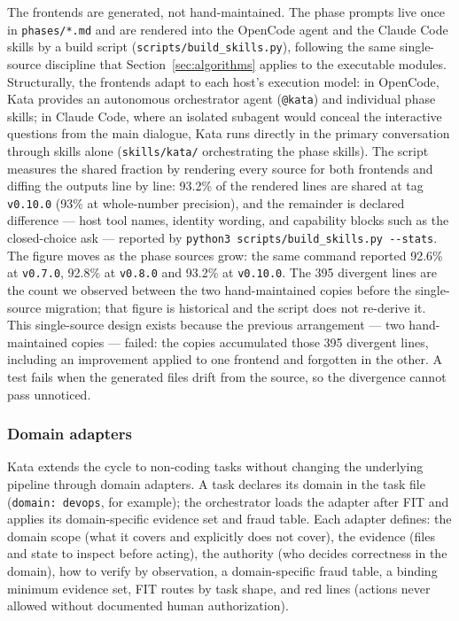 \documentclass{sbc2019}%
\begin{document}
The frontends are generated, not hand-maintained. The phase prompts live
once in \texttt{phases/*.md} and are rendered into the OpenCode agent and
the Claude Code skills by a build script (\texttt{scripts/build\_skills.py}),
following the same single-source discipline that Section~\ref{sec:algorithms}
applies to the executable modules. Structurally, the frontends adapt to each
host's execution model: in OpenCode, Kata provides an autonomous orchestrator
agent (\texttt{@kata}) and individual phase skills; in Claude Code, where an
isolated subagent would conceal the interactive questions from the main
dialogue, Kata runs directly in the primary conversation through skills
alone (\texttt{skills/kata/} orchestrating the phase skills).
The script measures the shared
fraction by rendering every source for both frontends and diffing the
outputs line by line: 93.2\% of the rendered lines are shared at tag
\texttt{v0.10.0} (93\% at whole-number precision), and the remainder is
declared difference --- host
tool names, identity wording, and capability blocks such as the
closed-choice ask --- reported by
\texttt{python3 scripts/build\_skills.py -{}-stats}. The figure moves as the
phase sources grow: the same command reported 92.6\% at \texttt{v0.7.0},
92.8\% at \texttt{v0.8.0} and 93.2\% at \texttt{v0.10.0}. The 395 divergent
lines are the count we observed between the two hand-maintained
copies before the single-source migration; that figure is historical and
the script does not re-derive it. This
single-source design exists because the previous arrangement --- two
hand-maintained copies --- failed: the copies accumulated those 395
divergent lines, including an improvement applied to one frontend and
forgotten in the other. A test fails when the generated files drift from
the source, so the divergence cannot pass unnoticed.

\subsubsection{Domain adapters}

Kata extends the cycle to non-coding tasks without changing the underlying
pipeline through domain adapters. A task declares its domain in the task
file (\texttt{domain: devops}, for example); the orchestrator loads the
adapter after FIT and applies its domain-specific evidence set and fraud
table. Each adapter defines: the domain scope (what it covers and
explicitly does not cover), the evidence (files and state to inspect before
acting), the authority (who decides correctness in the domain), how to
verify by observation, a domain-specific fraud table, a binding minimum
evidence set, FIT routes by task shape, and red lines (actions never
allowed without documented human authorization).
\end{document}
